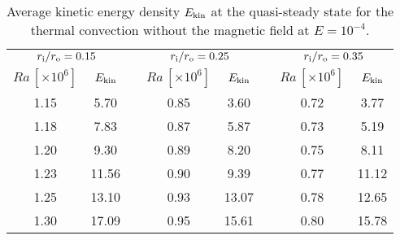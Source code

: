 \begin{table}
\caption{Average kinetic energy density $E_{\rm kin}$ at the quasi-steady state for the thermal convection without the magnetic field at $E = 10^{-4}$.}
\begin{center}
\begin{tabular}{|ccc|ccc|cc|}
   \hline
  \multicolumn{2}{|c|}{$r_{\rm i}/r_{\rm o} = 0.15$} & \hspace{5mm} &
  \multicolumn{2}{|c|}{$r_{\rm i}/r_{\rm o} = 0.25$} & \hspace{5mm} &
  \multicolumn{2}{|c|}{$r_{\rm i}/r_{\rm o} = 0.35$} \\
  $Ra \, [\times 10^6] $ &  $E_{\rm kin}$ & &
  $Ra \, [\times 10^6] $ &  $E_{\rm kin}$ & &
  $Ra \, [\times 10^6] $ &  $E_{\rm kin}$ \\
    \hline
  1.15 & 5.70 & & 0.85 & 3.60  & & 0.72 & 3.77 \\
  1.18 &  7.83 & & 0.87 & 5.87 & & 0.73 &  5.19 \\
  1.20 &  9.30 & & 0.89 & 8.20 & & 0.75 &  8.11 \\
  1.23 & 11.56 & & 0.90 & 9.39 & & 0.77 & 11.12 \\
  1.25 & 13.10 & & 0.93 & 13.07 & & 0.78 & 12.65  \\
  1.30 & 17.09 & & 0.95  & 15.61 & & 0.80 & 15.78 \\
 \hline
\end{tabular}
\end{center}
\label{table:Rac_Ek4}
\end{table}